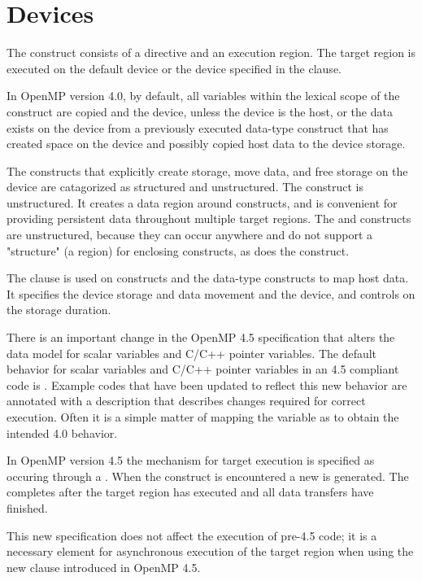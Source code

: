 \pagebreak
\chapter{Devices}
\label{chap:devices}

The  construct consists of a  directive 
and an execution region. The target region is executed on
the default device or the device specified in the  
clause. 

In OpenMP version 4.0, by default, all variables within the lexical
scope of the construct are copied  and  the
device, unless the device is the host, or the data exists on the
device from a previously executed data-type construct that
has created space on the device and possibly copied host
data to the device storage.

The constructs that explicitly
create storage, move data, and free storage on the device
are catagorized as structured and unstructured. The
 construct is unstructured. It creates
a data region around  constructs, and is
convenient for providing persistent data throughout multiple
target regions. The  and 
 constructs are unstructured, because 
they can occur anywhere and do not support a "structure" 
(a region) for enclosing  constructs, as does the
 construct. 

The  clause is used on  
constructs and the data-type constructs to map host data. It 
specifies the device storage and data movement  and 
the device, and controls on the storage duration.

There is an important change in the OpenMP 4.5 specification
that alters the data model for scalar variables and C/C++ pointer variables.
The default behavior for scalar variables and C/C++ pointer variables
in an 4.5 compliant code is . Example
codes that have been updated to reflect this new behavior are
annotated with a description that describes changes required
for correct execution. Often it is a simple matter of mapping
the variable as  to obtain the intended 4.0 behavior.

In OpenMP version 4.5 the mechanism for target
execution is specified as occuring through a . 
When the  construct is encountered a new 
 is generated. The  
completes after the target region has executed and all data 
transfers have finished.

This new specification does not affect the execution of 
pre-4.5 code; it is a necessary element for asynchronous 
execution of the target region when using the new  
clause introduced in OpenMP 4.5.
